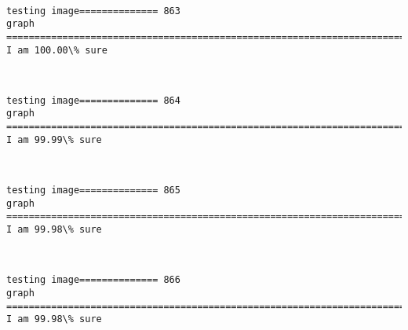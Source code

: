 \documentclass[11pt]{article}
\begin{document}
    \begin{center}
    \end{center}
    { \hspace*{\fill} \\}
    
    \begin{Verbatim}[commandchars=\\\{\}]
testing image============== 863
graph
============================================================================
I am 100.00\% sure

    \end{Verbatim}

    \begin{center}
    \end{center}
    { \hspace*{\fill} \\}
    
    \begin{Verbatim}[commandchars=\\\{\}]
testing image============== 864
graph
============================================================================
I am 99.99\% sure

    \end{Verbatim}

    \begin{center}
    \end{center}
    { \hspace*{\fill} \\}
    
    \begin{Verbatim}[commandchars=\\\{\}]
testing image============== 865
graph
============================================================================
I am 99.98\% sure

    \end{Verbatim}

    \begin{center}
    \end{center}
    { \hspace*{\fill} \\}
    
    \begin{Verbatim}[commandchars=\\\{\}]
testing image============== 866
graph
============================================================================
I am 99.98\% sure

    \end{Verbatim}
\end{document}
